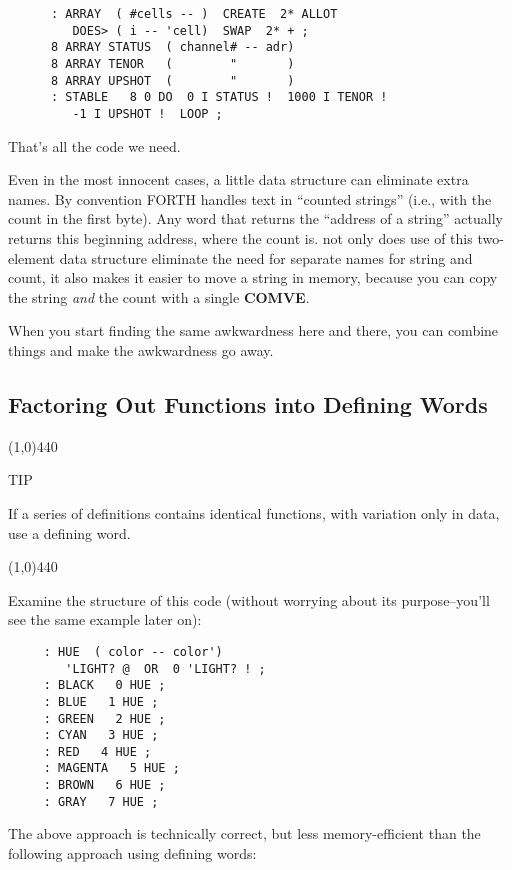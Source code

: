 \documentclass{book}
\begin{document}
\begin{verbatim}
      : ARRAY  ( #cells -- )  CREATE  2* ALLOT
         DOES> ( i -- 'cell)  SWAP  2* + ; 
      8 ARRAY STATUS  ( channel# -- adr)
      8 ARRAY TENOR   (        "       )
      8 ARRAY UPSHOT  (        "       )
      : STABLE   8 0 DO  0 I STATUS !  1000 I TENOR ! 
         -1 I UPSHOT !  LOOP ;
\end{verbatim}

\noindent That's all the code we need.

Even in the most innocent cases, a little data structure can eliminate extra names. By convention FORTH handles text in ``counted strings'' (i.e., with the count in the first byte). Any word that returns the ``address of a string'' actually returns this beginning address, where the count is. not only does use of this two-element data structure eliminate the need for separate names for string and count, it also makes it easier to move a string in memory, because you can copy the string \textit{and} the count
with a single \textbf{COMVE}.

When you start finding the same awkwardness here and there, you can combine things and make the awkwardness go away.

\subsection*{
	\textbf{Factoring Out Functions into Defining Words}}

\indent \indent \line(1,0){440} 

TIP

If a series of definitions contains identical functions, with variation only in data, use a defining word.

\line(1,0){440}

\bigskip

\noindent
Examine the structure of this code (without worrying about its purpose--you'll see the same example later on):

\begin{verbatim}
     : HUE  ( color -- color') 
        'LIGHT? @  OR  0 'LIGHT? ! ;
     : BLACK   0 HUE ;
     : BLUE   1 HUE ;
     : GREEN   2 HUE ;
     : CYAN   3 HUE ;
     : RED   4 HUE ;
     : MAGENTA   5 HUE ;
     : BROWN   6 HUE ;
     : GRAY   7 HUE ;
\end{verbatim}

\noindent The above approach is technically correct, but less memory-efficient than the following approach using defining words:
\end{document}
